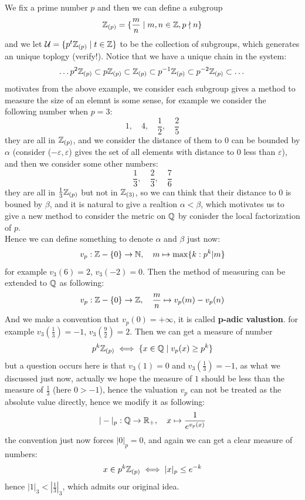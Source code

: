 \begin{example}
    We fix a prime number \(p\) and then we can define a subgroup 
    \[\mathbb{Z}_{(p)} = \{\frac{m}{n} \mid m,n \in \mathbb{Z}, p \nmid n\}\]
    and we let \(\mathcal{U}= \{p^t\mathbb{Z}_{(p)} \mid t \in \mathbb{Z}\}\) to be the collection of subgroups, which generates an unique toplogy (verify!).
    Notice that we have a unique chain in the system:
    \[\dots p^2 \mathbb{Z}_{(p)} \subset p \mathbb{Z}_{(p)} \subset \mathbb{Z}_{(p)} \subset p^{-1} \mathbb{Z}_{(p)} \subset p^{-2} \mathbb{Z}_{(p)} \subset \dots\]
    motivates from the above example, we consider each subgroup gives a method to measure the size of an elemnt is some sense, for example we consider the following number when \(p=3\):
    \[1, \quad 4, \quad \frac{1}{2}, \quad \frac{2}{5}\]
    they are all in \(\mathbb{Z}_{(p)}\), and we consider the distance of them to \(0\) can be bounded by \(\alpha\) (consider (\(-\varepsilon,\varepsilon\)) gives the set of all elements with distance to \(0\) less than \(\varepsilon\)), and then we consider some other numbers:
    \[\frac{1}{3}, \quad \frac{2}{3}, \quad \frac{7}{6}\]
    they are all in \(\frac{1}{3}\mathbb{Z}_{(p)}\) but not in \(\mathbb{Z}_{(3)}\), so we can think that their distance to \(0\) is bouned by \(\beta\), and it is natural to give a realtion \(\alpha < \beta\), which motivates us to give a new method to consider the metric on \(\mathbb{Q}\) by conisder the local factorization of \(p\).\\

    Hence we can define something to denote \(\alpha\) and \(\beta\) just now:
    \[v_p: \mathbb{Z}-\{0\} \to \mathbb{N}, \quad m \mapsto \max\{k : p^k | m\}  \]
    for example \(v_3(6) = 2\), \(v_3(-2) = 0\). Then the method of measuring can be extended to \(\mathbb{Q}\) as following:
    \[v_p: \mathbb{Z}-\{0\} \to \mathbb{Z}, \quad \frac{m}{n} \mapsto v_p(m)-v_p(n)\]
    And we make a convention that \(v_p(0) = +\infty\), it is called \textbf{p-adic valustion}. for example \(v_3(\frac{1}{3}) = -1\), \(v_3(\frac{9}{2}) = 2\). Then we can get a measure of number
    \[p^k \mathbb{Z}_{(p)} \iff \{x \in \mathbb{Q} \mid v_p(x) \geq p^k\}\]
    but a question occurs here is that \(v_3(1) = 0\) and \(v_3(\frac{1}{3}) = -1\), as what we discussed just now, actually we hope the measure of \(1\) should be less than the measure of \(\frac{1}{3}\) (here \(0>-1\)), hence the valuation \(v_p\) can not be treated as the absolute value directly, hence we modify it as following:
    \[|-|_p: \mathbb{Q} \to \mathbb{R}_+, \quad x \mapsto \frac{1}{e^{v_p(x)}}\]
    the convention just now forces \(|0|_p = 0\), and again we can get a clear measure of numbers:
    \[x \in p^k\mathbb{Z}_{(p)} \iff |x|_p \leq e^{-k}\]
    hence \(|1|_3 < |\frac{1}{3}|_3\), which admits our original idea.
\end{example}

